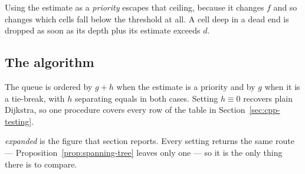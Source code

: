 Using the estimate as a \emph{priority} escapes that ceiling, because it changes
$f$ and so changes which cells fall below the threshold at all. A cell deep in a
dead end is dropped as soon as its depth plus its estimate exceeds $d$.

\subsection{The algorithm}

\begin{algorithm}[H]
\caption{Shortest route to the exit, with an estimate as guide.}
\label{alg:search}
\BlankLine
{}
\end{algorithm}

The queue is ordered by $g+h$ when the estimate is a priority and by $g$ when it
is a tie-break, with $h$ separating equals in both cases. Setting $h\equiv0$
recovers plain Dijkstra, so one procedure covers every row of the table in
Section~\ref{sec:cpp-testing}.

\emph{expanded} is the figure that section reports. Every setting returns the
same route --- Proposition~\ref{prop:spanning-tree} leaves only one --- so it is
the only thing there is to compare.
